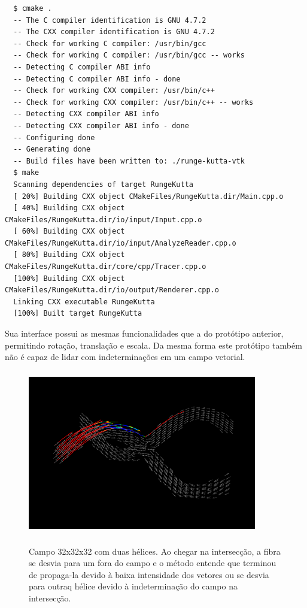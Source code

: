   {\scriptsize
  \begin{verbatim}
  $ cmake .
  -- The C compiler identification is GNU 4.7.2
  -- The CXX compiler identification is GNU 4.7.2
  -- Check for working C compiler: /usr/bin/gcc
  -- Check for working C compiler: /usr/bin/gcc -- works
  -- Detecting C compiler ABI info
  -- Detecting C compiler ABI info - done
  -- Check for working CXX compiler: /usr/bin/c++
  -- Check for working CXX compiler: /usr/bin/c++ -- works
  -- Detecting CXX compiler ABI info
  -- Detecting CXX compiler ABI info - done
  -- Configuring done
  -- Generating done
  -- Build files have been written to: ./runge-kutta-vtk
  $ make
  Scanning dependencies of target RungeKutta
  [ 20%] Building CXX object CMakeFiles/RungeKutta.dir/Main.cpp.o
  [ 40%] Building CXX object CMakeFiles/RungeKutta.dir/io/input/Input.cpp.o
  [ 60%] Building CXX object CMakeFiles/RungeKutta.dir/io/input/AnalyzeReader.cpp.o
  [ 80%] Building CXX object CMakeFiles/RungeKutta.dir/core/cpp/Tracer.cpp.o
  [100%] Building CXX object CMakeFiles/RungeKutta.dir/io/output/Renderer.cpp.o
  Linking CXX executable RungeKutta
  [100%] Built target RungeKutta
  \end{verbatim}
  }
  
  Sua interface possui as mesmas funcionalidades que a do protótipo anterior, permitindo rotação, translação e escala. Da mesma forma este protótipo também não é capaz de lidar com indeterminações em um campo vetorial.
  
  \begin{figure}[!h]
    \begin{center}
      \includegraphics[width=100mm, height=72mm]{images/fibraecampo-vtk.png}
      \label{fig:fibraecampo-vtk}
      \caption{Campo 32x32x32 com duas hélices. Ao chegar na intersecção, a fibra se desvia para um fora do campo e o método entende que terminou de propaga-la devido à baixa intensidade dos vetores ou se desvia para outraq hélice devido à indeterminação do campo na intersecção.}
    \end{center}
  \end{figure}

